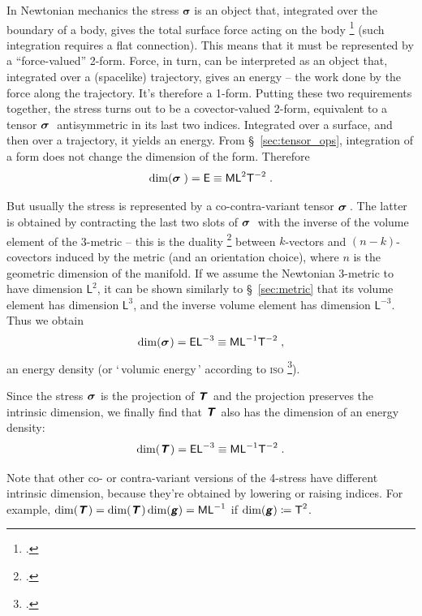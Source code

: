 \documentclass[a4paper,12pt,onecolumn,oneside,article,british]{memoir}
\makeatletter
\newcommand*{\defquote}[1]{`\,#1\,'}
\newcommand*{\mathte}[1]{\textbf{\textit{\textsf{#1}}}}
\newcommand*{\citep}{\footcites}
\newcommand*{\defd}{\coloneqq}
\newcommand*{\sect}{\S}%
\newcommand*{\chap}{ch.}%
\newcommand*{\q}{}%
\DeclareRobustCommand*{\q}{%
  \mathbin{\mathpalette\bigcdot@{}}%
}
\newcommand*{\bigcdot@scalefactor}{0.7}
\newcommand*{\bigcdot@widthfactor}{1.5}
\newcommand*{\bigcdot@}[2]{%
  \sbox0{$#1\vcenter{}$}%
  \sbox2{$#1\cdot\m@th$}%
  \hbox to \bigcdot@widthfactor\wd2{%
    \hfil
    \raise\ht0\hbox{%
      \scalebox{\bigcdot@scalefactor}{%
        \lower\ht0\hbox{$#1\bullet\m@th$}%
      }%
    }%
    \hfil
  }%
}
\newcommand*{\Le}{\textsf{L}}
\newcommand*{\Ti}{\textsf{T}}
\newcommand*{\Ma}{\textsf{M}}
\newcommand*{\En}{\textsf{E}}
\newcommand*{\yg}{\mathte{g}}
\newcommand*{\yT}{\mathte{T}}
\renewcommand*{\i}{\indices}
\newcommand*{\yt}{\bm{\sigma}}
\makeatother
\begin{document}
In Newtonian mechanics the stress $\yt$ is an object that, integrated over
the boundary of a body, gives the total surface force acting on the body
\citep[\chap~III]{truesdell1977_r1991} (such integration requires a flat
connection). This means that it must be represented by a
\enquote{force-valued} 2-form. Force, in turn, can be interpreted as an
object that, integrated over a (spacelike) trajectory, gives an energy --
the work done by the force along the trajectory. It's therefore a 1-form.
Putting these two requirements together, the stress turns out to be a
covector-valued 2-form, equivalent to a tensor $\yt\i{_{\q\;\q\q}}$
antisymmetric in its last two indices. Integrated over a surface, and then
over a trajectory, it yields an energy. From \sect~\ref{sec:tensor_ops},
integration of a form does not change the dimension of the form. Therefore
\begin{equation}
  \label{eq:dim_3stress_form}
  \dim(\yt\i{_{\q\;\q\q}}) = \En \equiv \Ma\Le^{2}\Ti^{-2} \;.
\end{equation}

But usually the stress is represented by a co-contra-variant tensor
$\yt\i{_{\q}^{\q}}$\,. The latter is obtained by contracting the last two
slots of $\yt\i{_{\q\;\q\q}}$ with the inverse of the volume element of the
3-metric -- this is the duality \citep[\sect~4.1.2]{bossavit1991} between
$k$-vectors and $(n-k)$-covectors induced by the metric (and an orientation
choice), where $n$ is the geometric dimension of the manifold. If we assume
the Newtonian 3-metric to have dimension $\Le^{2}$, it can be shown
similarly to \sect~\ref{sec:metric} that its volume element has dimension
$\Le^{3}$, and the inverse volume element has dimension $\Le^{-3}$. Thus we
obtain
\begin{equation}
  \label{eq:dim_3stress}
  \dim(\yt\i{_{\q}^{\q}}) = \En\Le^{-3} \equiv \Ma\Le^{-1}\Ti^{-2} \;,
\end{equation}
an energy density (or \defquote{volumic energy} according to \textsc{iso}
\citep[item~A.6.2]{iso2009}).

Since the stress $\yt\i{_{\q}^{\q}}$ is the projection of
$\yT\i{_{\q}^{\q}}$ and the projection preserves the intrinsic dimension, we
finally find that $\yT\i{_{\q}^{\q}}$ also has the dimension of an energy density:
\begin{equation}
  \label{eq:dim_4stress}
  \dim(\yT\i{_{\q}^{\q}}) = \En\Le^{-3} \equiv \Ma\Le^{-1}\Ti^{-2} \;.
\end{equation}

Note that other co- or contra-variant versions of the 4-stress  have
different intrinsic dimension, because they're obtained by lowering or
raising indices. For example,
$\dim(\yT\i{_{\q\q}})=\dim(\yT\i{_{\q}^{\q}})\dim(\yg)=\Ma\Le^{-1}$ if
$\dim(\yg)\defd \Ti^{2}$.
\end{document}
